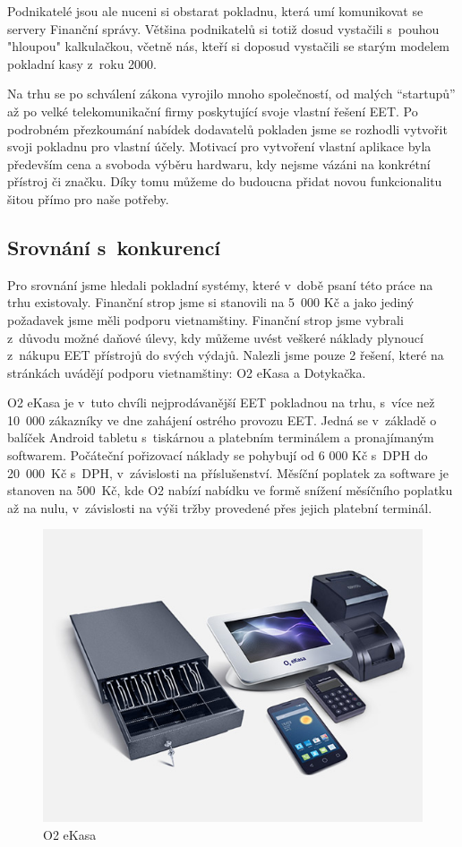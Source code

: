 \documentclass[a4paper,11pt,oneside]{article}
\begin{document}
Podnikatelé jsou ale nuceni si obstarat pokladnu, která umí komunikovat se servery Finanční správy. Většina podnikatelů si totiž dosud vystačili s~pouhou "hloupou" kalkulačkou, včetně nás, kteří si doposud vystačili se starým modelem pokladní kasy z~roku 2000. 

Na trhu se po schválení zákona vyrojilo mnoho společností, od malých \enquote{start\-upů} až po velké telekomunikační firmy poskytující svoje vlastní řešení EET. Po podrobném přezkoumání nabídek dodavatelů pokladen jsme se rozhodli vytvořit svoji pokladnu pro vlastní účely. Motivací pro vytvoření vlastní aplikace byla především cena a svoboda výběru hardwaru, kdy nejsme vázáni na konkrétní přístroj či značku. Díky tomu můžeme do budoucna přidat novou funkcionalitu šitou přímo pro naše potřeby. 

\subsection{Srovnání s~konkurencí}
Pro srovnání jsme hledali pokladní systémy, které v~době psaní této práce na trhu existovaly. Finanční strop jsme si stanovili na 5~000 Kč a jako jediný požadavek jsme měli podporu vietnamštiny. Finanční strop jsme vybrali z~důvodu možné daňové úlevy, kdy můžeme uvést veškeré náklady plynoucí z~nákupu EET přístrojů do svých výdajů. Nalezli jsme pouze 2 řešení, které na stránkách uvádějí podporu vietnamštiny: O2 eKasa a Dotykačka. 

O2 eKasa je v~tuto chvíli nejprodávanější EET pokladnou na trhu, s~více než 10~000 zákazníky ve dne zahájení ostrého provozu EET\cite{o2ekasa}. Jedná se v~základě o balíček Android tabletu s~tiskárnou a platebním terminálem a pronajímaným softwarem. Počáteční pořizovací náklady se pohybují od 6 000 Kč s~DPH do 20~000~Kč s~DPH, v~závislosti na příslušenství. Měsíční poplatek za software je stanoven na 500~Kč, kde O2 nabízí nabídku ve formě snížení měsíčního poplatku až na nulu, v~závislosti na výši tržby provedené přes jejich platební terminál.

\begin{figure}[H]
	\centering
	\includegraphics[width=0.7\linewidth]{../o2_ekasa}
	\caption{O2 eKasa}
	\label{fig:o2ekasa}
\end{figure}
\end{document}
